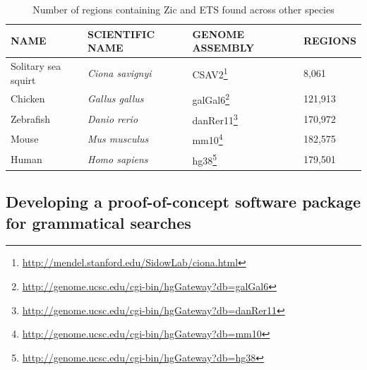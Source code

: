 \begin{small}
    \begin{table}[ht]
        \centering
        \caption{Number of regions containing Zic and ETS found across other species} 
        \begin{tabular}{|l|l|l|l|}
            \hline
            \textbf{NAME} & \textbf{SCIENTIFIC NAME} & \textbf{GENOME ASSEMBLY} & \textbf{REGIONS} \\ \hline 
            

            Solitary sea squirt & \textit{Ciona savignyi} & CSAV2\footnote{\href{http://mendel.stanford.edu/SidowLab/ciona.html}{http://mendel.stanford.edu/SidowLab/ciona.html}} \cite{hill2008} & 8,061\\
            Chicken & \textit{Gallus gallus} & galGal6\footnote{\href{http://genome.ucsc.edu/cgi-bin/hgGateway?db=galGal6}{http://genome.ucsc.edu/cgi-bin/hgGateway?db=galGal6}} & 121,913\\
            Zebrafish & \textit{Danio rerio} & danRer11\footnote{\href{http://genome.ucsc.edu/cgi-bin/hgGateway?db=danRer11}{http://genome.ucsc.edu/cgi-bin/hgGateway?db=danRer11}} & 170,972\\
            Mouse & \textit{Mus musculus} & mm10\footnote{\href{http://genome.ucsc.edu/cgi-bin/hgGateway?db=mm10}{http://genome.ucsc.edu/cgi-bin/hgGateway?db=mm10}} & 182,575\\
            Human & \textit{Homo sapiens} & hg38\footnote{\href{http://genome.ucsc.edu/cgi-bin/hgGateway?db=hg38}{http://genome.ucsc.edu/cgi-bin/hgGateway?db=hg38}} & 179,501\\
            \hline
        \end{tabular}
        \label{tab:genome search vertebrate numbers}
    \end{table}
\end{small}

\subsection{Developing a proof-of-concept software package for grammatical searches}

